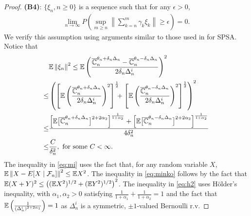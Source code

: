\begin{proof}
\noindent\textbf{(B4)}: $\{\xi_n, n\ge 0\}$ is a sequence such that for any $\epsilon>0$,
\begin{align}
 \lim_{n\rightarrow\infty} P\left( \sup_{m\geq n}  \left\|
\sum_{k=n}^{m} \gamma_k \xi_k\right\| \geq \epsilon \right) = 0. 
\label{eq:b4}
\end{align}
We verify this assumption using arguments similar to those used in \cite{spall} for SPSA.
Notice that 
\begin{align}
&\mathbb{E}\left\| \xi_n\right\|^2\le \mathbb{E}\left(\dfrac{\overline {\mathbb{C}}_n^{\theta_n + \delta_n \Delta_n} -\overline {\mathbb{C}}_n^{\theta_n - \delta_n \Delta_n}}{2 \delta_n \Delta_n^i}\right)^2 \label{eq:mi}\\
\le &\left(\left[\mathbb{E}\left(\dfrac{\overline {\mathbb{C}}_n^{\theta_n + \delta_n \Delta_n}}{2 \delta_n \Delta_n^i}\right)^2\right]^{\frac1{2}}\!\!\!+ \left[\mathbb{E}\left(\dfrac{\overline {\mathbb{C}}_n^{\theta_n - \delta_n \Delta_n}}{2 \delta_n \Delta_n^i}\right)^2\right]^{\frac1{2}}\right)^2\!\! \label{eq:minko}\\
\le &\dfrac{\Big[\mathbb{E}\big[ \overline {\mathbb{C}}_n^{\theta_n + \delta_n \Delta_n}\big]^{2+2\alpha_2}\Big]^{\frac{1}{1+\alpha_2}}   +
\Big[\mathbb{E}\big[\overline {\mathbb{C}}_n^{\theta_n - \delta_n \Delta_n}\big]^{2+2\alpha_2}\Big]^{\frac{1}{1+\alpha_2}}}{4\delta_n^2} \label{eq:h2}\\
\le & \frac{C}{\delta_n^2}, \text{ for some } C< \infty. \label{eq:h3}
\end{align}
The inequality in \eqref{eq:mi} uses the fact that, for any random variable $X$, $\mathbb{E}\left\|X -  E[X\mid\mathcal{F}_n]\right\|^2 \le \mathbb{E} X^2$. The inequality in \eqref{eq:minko} follows by the fact that $\mathbb{E} (X+Y)^2 \le \left( (\mathbb{E} X^2)^{1/2} + (\mathbb{E} Y^2)^{1/2}\right)^2$.
The inequality in \eqref{eq:h2} uses H\"{o}lder's inequality, with $\alpha_1, \alpha_2>0$ satisfying $\frac{1}{1+\alpha_1} + \frac{1}{1+\alpha_2}=1$ and the fact that $\mathbb{E}\left(\frac1{(\Delta_n^i)^{2+2\alpha_1}}\right)  = 1$ as $\Delta_n^i$ is a symmetric, $\pm 1$-valued Bernoulli r.v. 

\end{proof}

